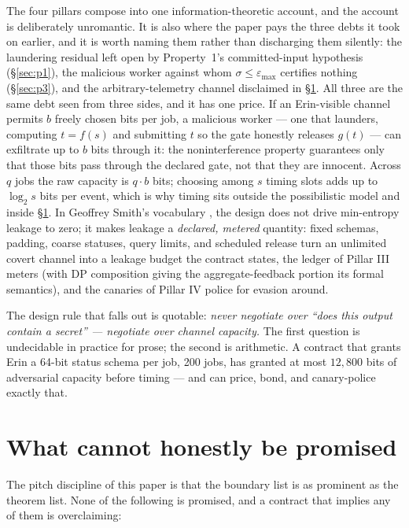 \documentclass[11pt,a4paper]{article}
\begin{document}
The four pillars compose into one information-theoretic account, and the account is deliberately unromantic. It is also where the
paper pays the three debts it took on earlier, and it is worth naming them rather than discharging them silently: the laundering
residual left open by Property~1's committed-input hypothesis (\S\ref{sec:p1}), the malicious worker against whom
$\sigma\le\varepsilon_{\max}$ certifies nothing (\S\ref{sec:p3}), and the arbitrary-telemetry channel disclaimed in
\S\ref{sec:cannot}. All three are the same debt seen from three sides, and it has one price. If an Erin-visible
channel permits $b$ freely chosen bits per job, a malicious worker --- one that launders, computing $t=f(s)$ and submitting $t$ so
the gate honestly releases $g(t)$ --- can exfiltrate up to $b$ bits through it: the
noninterference property guarantees only that those bits pass through the declared gate, not that they are innocent. Across $q$
jobs the raw capacity is $q\cdot b$ bits; choosing among $s$ timing slots adds up to $\log_2 s$ bits per event, which is why
timing sits outside the possibilistic model and inside \S\ref{sec:cannot}. In Geoffrey Smith's vocabulary \cite{smith-qif}, the
design does not drive min-entropy leakage to zero; it makes leakage a \emph{declared, metered} quantity: fixed schemas, padding,
coarse statuses, query limits, and scheduled release turn an unlimited covert channel into a leakage budget the contract states,
the ledger of Pillar III meters (with DP composition giving the aggregate-feedback portion its formal semantics), and the canaries
of Pillar IV police for evasion around.

The design rule that falls out is quotable: \emph{never negotiate over ``does this output contain a secret'' --- negotiate over
channel capacity.} The first question is undecidable in practice for prose; the second is arithmetic. A contract that grants Erin
a 64-bit status schema per job, 200 jobs, has granted at most $12{,}800$ bits of adversarial capacity before timing --- and can
price, bond, and canary-police exactly that.

\section{What cannot honestly be promised}\label{sec:cannot}

The pitch discipline of this paper is that the boundary list is as prominent as the theorem list. None of the following is
promised, and a contract that implies any of them is overclaiming:
\end{document}
